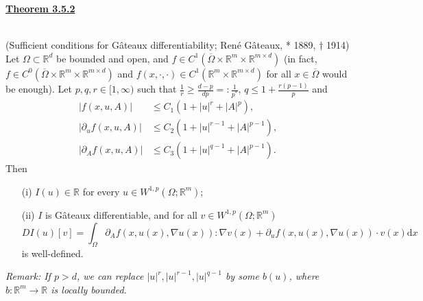 \hypertarget{theorem_3_5_2}{\textbf{\underline{Theorem 3.5.2}}}\\
(Sufficient conditions for G\^ateaux differentiability; Ren\'e G\^ateaux, * 1889, $\dagger$ 1914)\\
Let $\Omega\subset\mathbb{R}^d$ be bounded and open, and $f\in C^1(\overline{\Omega}\times\mathbb{R}^m\times\mathbb{R}^{m\times d})$ (in fact, $f\in C^0(\overline{\Omega}\times\mathbb{R}^m\times\mathbb{R}^{m\times d})$ and $f(x,\cdot,\cdot)\in C^1(\mathbb{R}^m\times\mathbb{R}^{m\times d})$ for all $x\in\overline{\Omega}$ would be enough). Let $p,q,r\in[1,\infty)$ such that $\frac{1}{r}\geq\frac{d-p}{dp}=:\frac{1}{p^*}$, $q\leq 1+\frac{r(p-1)}{p}$ and
\begin{align}
	\lvert f(x,u,A)\rvert&\leq C_1(1+\lvert u\rvert^r+\lvert A\rvert^p)\label{eq:mcov_formula_3_1},\\
	\lvert\partial_uf(x,u,A)\rvert&\leq C_2(1+\lvert u\rvert^{r-1}+\lvert A\rvert^{p-1})\label{eq:mcov_formula_3_2},\\
	\lvert\partial_Af(x,u,A)\rvert&\leq C_3(1+\lvert u\rvert^{q-1}+\lvert A\rvert^{p-1})\label{eq:mcov_formula_3_3}.
\end{align}
Then
\begin{itemize}
	\item[(i)] $I(u)\in\mathbb{R}$ for every $u\in W^{1,p}(\Omega;\mathbb{R}^m)$;
	\item[(ii)] $I$ is G\^ateaux differentiable, and for all $v\in W^{1,p}(\Omega;\mathbb{R}^m)$
	\[DI(u)[v]=\int_\Omega{\partial_Af(x,u(x),\nabla u(x)):\nabla v(x)+\partial_uf(x,u(x),\nabla u(x))\cdot v(x)\mathrm{d}x}\]
	is well-defined.
\end{itemize}

\textit{Remark: If $p>d$, we can replace $\lvert u\rvert^r,\lvert u\rvert^{r-1},\lvert u\rvert^{q-1}$ by some $b(u)$, where $b:\mathbb{R}^m\longrightarrow\mathbb{R}$ is locally bounded.}\\

